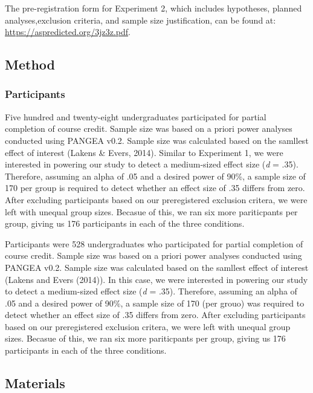 \documentclass[english,doc]{apa6}
\begin{document}
The pre-registration form for Experiment 2, which includes hypotheses, planned analyses,exclusion criteria, and sample size justification, can be found at: \url{https://aspredicted.org/3jz3z.pdf}.

\hypertarget{method-1}{%
\subsection{Method}\label{method-1}}

\hypertarget{participants-1}{%
\subsubsection{Participants}\label{participants-1}}

Five hundred and twenty-eight undergraduates participated for partial completion of course credit. Sample size was based on a priori power analyses conducted using PANGEA v0.2. Sample size was calculated based on the samllest effect of interest (Lakens \& Evers, 2014). Similar to Experiment 1, we were interested in powering our study to detect a medium-sized effect size (\emph{d} = .35). Therefore, assuming an alpha of .05 and a desired power of 90\%, a sample size of 170 per group is required to detect whether an effect size of .35 differs from zero. After excluding participants based on our preregistered exclusion critera, we were left with unequal group sizes. Becasue of this, we ran six more pariticpants per group, giving us 176 participants in each of the three conditions.

Participants were 528 undergraduates who participated for partial completion of course credit. Sample size was based on a priori power analyses conducted using PANGEA v0.2. Sample size was calculated based on the samllest effect of interest (Lakens and Evers (2014)). In this case, we were interested in powering our study to detect a medium-sized effect size (\emph{d} = .35). Therefore, assuming an alpha of .05 and a desired power of 90\%, a sample size of 170 (per grouo) was required to detect whether an effect size of .35 differs from zero. After excluding participants based on our preregistered exclusion critera, we were left with unequal group sizes. Becasue of this, we ran six more pariticpants per group, giving us 176 participants in each of the three conditions.

\hypertarget{materials-1}{%
\subsection{Materials}\label{materials-1}}
\end{document}
